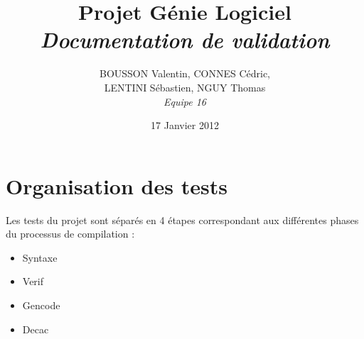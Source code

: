 \documentclass[11pt]{article}
\title{Projet Génie Logiciel\\\emph{Documentation de validation}}
\author{BOUSSON Valentin, CONNES Cédric,\\LENTINI Sébastien, NGUY Thomas\\\emph{Equipe 16}}
\date{17 Janvier 2012}
\begin{document}
\maketitle


\section{Organisation des tests}
Les tests du projet sont séparés en 4 étapes correspondant aux différentes phases du processus de compilation :
\begin{itemize}
\item Syntaxe
\item Verif
\item Gencode
\item Decac
\end{itemize}
\end{document}
